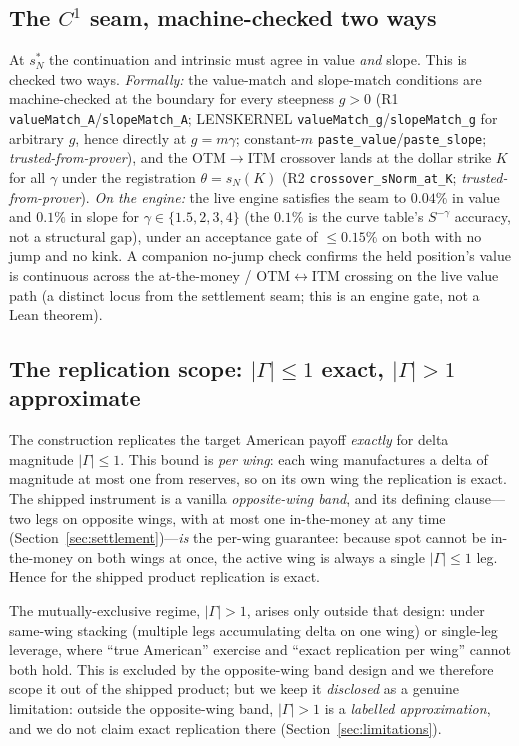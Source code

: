 \documentclass[runningheads]{llncs}
\newcommand{\tfp}{\emph{trusted-from-prover}}
\begin{document}
\subsection{The $C^{1}$ seam, machine-checked two ways}
At $s_{N}^{\ast}$ the continuation and intrinsic must agree in value \emph{and}
slope. This is checked two ways.
\emph{Formally:} the value-match and slope-match conditions are
machine-checked at the boundary for every steepness $g>0$ (R1
\texttt{valueMatch\_A}/\texttt{slopeMatch\_A}; LENSKERNEL
\texttt{valueMatch\_g}/\texttt{slopeMatch\_g} for arbitrary $g$, hence directly at
$g=m\gamma$; constant-$m$ \texttt{paste\_value}/\texttt{paste\_slope}; \tfp{}),
and the OTM$\to$ITM crossover lands at the dollar strike $K$ for all $\gamma$
under the registration $\theta=s_{N}(K)$ (R2 \texttt{crossover\_sNorm\_at\_K};
\tfp{}).
\emph{On the engine:} the live engine satisfies the seam to $0.04\%$ in value and
$0.1\%$ in slope for $\gamma\in\{1.5,2,3,4\}$ (the $0.1\%$ is the curve table's
$S^{-\gamma}$ accuracy, not a structural gap), under an acceptance gate of
$\le 0.15\%$ on both with no jump and no kink. A companion no-jump check confirms
the held position's value is continuous across the at-the-money / OTM$\leftrightarrow$ITM
crossing on the live value path (a distinct locus from the settlement seam; this
is an engine gate, not a Lean theorem).

\subsection{The replication scope: $|\Gamma|\le1$ exact, $|\Gamma|>1$ approximate}
\label{sec:gamma}
The construction replicates the target American payoff \emph{exactly} for delta
magnitude $|\Gamma|\le1$. This bound is \emph{per wing}: each wing manufactures a
delta of magnitude at most one from reserves, so on its own wing the replication
is exact. The shipped instrument is a vanilla \emph{opposite-wing band}, and its
defining clause---two legs on opposite wings, with at most one in-the-money at any
time (Section~\ref{sec:settlement})---\emph{is} the per-wing guarantee: because
spot cannot be in-the-money on both wings at once, the active wing is always a
single $|\Gamma|\le1$ leg. Hence for the shipped product replication is exact.

The mutually-exclusive regime, $|\Gamma|>1$, arises only outside that design:
under same-wing stacking (multiple legs accumulating delta on one wing) or
single-leg leverage, where ``true American'' exercise and ``exact replication per
wing'' cannot both hold. This is excluded by the opposite-wing band design and we
therefore scope it out of the shipped product; but we keep it \emph{disclosed} as
a genuine limitation: outside the opposite-wing band, $|\Gamma|>1$ is a
\emph{labelled approximation}, and we do not claim exact replication there
(Section~\ref{sec:limitations}).
\end{document}
